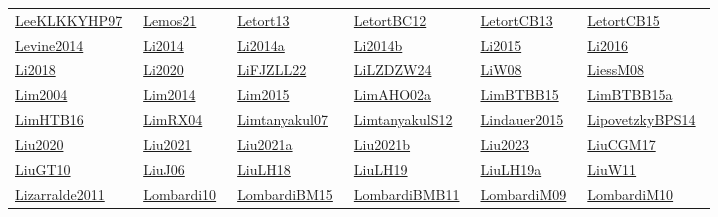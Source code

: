 \begin{longtable}{*{6}{l}}
\href{../works/LeeKLKKYHP97.pdf}{LeeKLKKYHP97}~\cite{LeeKLKKYHP97} & \href{../works/Lemos21.pdf}{Lemos21}~\cite{Lemos21} & \href{../works/Letort13.pdf}{Letort13}~\cite{Letort13} & \href{../works/LetortBC12.pdf}{LetortBC12}~\cite{LetortBC12} & \href{../works/LetortCB13.pdf}{LetortCB13}~\cite{LetortCB13} & \href{../works/LetortCB15.pdf}{LetortCB15}~\cite{LetortCB15}\\ 
\href{../}{Levine2014}~\cite{Levine2014} & \href{../}{Li2014}~\cite{Li2014} & \href{../}{Li2014a}~\cite{Li2014a} & \href{../}{Li2014b}~\cite{Li2014b} & \href{../}{Li2015}~\cite{Li2015} & \href{../}{Li2016}~\cite{Li2016}\\ 
\href{../}{Li2018}~\cite{Li2018} & \href{../}{Li2020}~\cite{Li2020} & \href{../works/LiFJZLL22.pdf}{LiFJZLL22}~\cite{LiFJZLL22} & \href{../works/LiLZDZW24.pdf}{LiLZDZW24}~\cite{LiLZDZW24} & \href{../works/LiW08.pdf}{LiW08}~\cite{LiW08} & \href{../works/LiessM08.pdf}{LiessM08}~\cite{LiessM08}\\ 
\href{../}{Lim2004}~\cite{Lim2004} & \href{../}{Lim2014}~\cite{Lim2014} & \href{../}{Lim2015}~\cite{Lim2015} & \href{../works/LimAHO02a.pdf}{LimAHO02a}~\cite{LimAHO02a} & \href{../works/LimBTBB15.pdf}{LimBTBB15}~\cite{LimBTBB15} & \href{../works/LimBTBB15a.pdf}{LimBTBB15a}~\cite{LimBTBB15a}\\ 
\href{../works/LimHTB16.pdf}{LimHTB16}~\cite{LimHTB16} & \href{../works/LimRX04.pdf}{LimRX04}~\cite{LimRX04} & \href{../works/Limtanyakul07.pdf}{Limtanyakul07}~\cite{Limtanyakul07} & \href{../works/LimtanyakulS12.pdf}{LimtanyakulS12}~\cite{LimtanyakulS12} & \href{../}{Lindauer2015}~\cite{Lindauer2015} & \href{../works/LipovetzkyBPS14.pdf}{LipovetzkyBPS14}~\cite{LipovetzkyBPS14}\\ 
\href{../}{Liu2020}~\cite{Liu2020} & \href{../}{Liu2021}~\cite{Liu2021} & \href{../}{Liu2021a}~\cite{Liu2021a} & \href{../}{Liu2021b}~\cite{Liu2021b} & \href{../}{Liu2023}~\cite{Liu2023} & \href{../works/LiuCGM17.pdf}{LiuCGM17}~\cite{LiuCGM17}\\ 
\href{../}{LiuGT10}~\cite{LiuGT10} & \href{../works/LiuJ06.pdf}{LiuJ06}~\cite{LiuJ06} & \href{../works/LiuLH18.pdf}{LiuLH18}~\cite{LiuLH18} & \href{../works/LiuLH19.pdf}{LiuLH19}~\cite{LiuLH19} & \href{../works/LiuLH19a.pdf}{LiuLH19a}~\cite{LiuLH19a} & \href{../works/LiuW11.pdf}{LiuW11}~\cite{LiuW11}\\ 
\href{../}{Lizarralde2011}~\cite{Lizarralde2011} & \href{../works/Lombardi10.pdf}{Lombardi10}~\cite{Lombardi10} & \href{../works/LombardiBM15.pdf}{LombardiBM15}~\cite{LombardiBM15} & \href{../works/LombardiBMB11.pdf}{LombardiBMB11}~\cite{LombardiBMB11} & \href{../works/LombardiM09.pdf}{LombardiM09}~\cite{LombardiM09} & \href{../works/LombardiM10.pdf}{LombardiM10}~\cite{LombardiM10}\\ 

\end{longtable}
